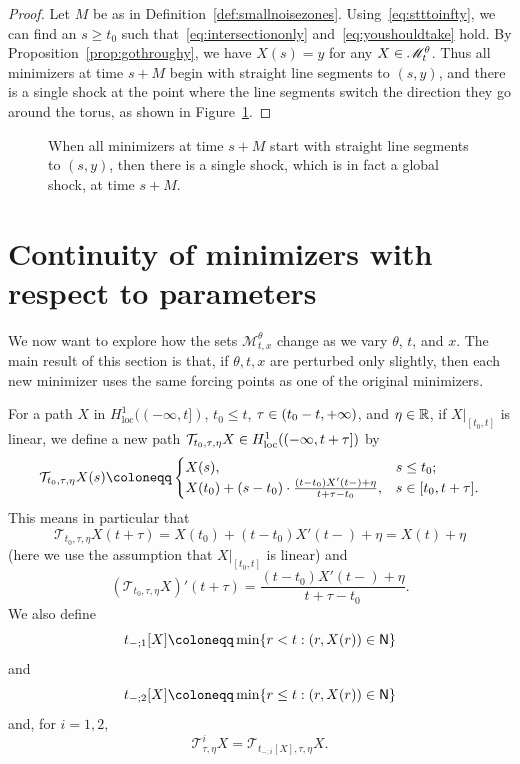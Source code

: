 \documentclass[AHL,Unicode,longabstracts]{cedram}
\newcounter{setofcase}
\newcounter{case}[setofcase]
\newcommand*\ssN{\mathsf{N}}
\newcommand*\scM{\mathscr{M}}
\newcommand*\RR{\mathbb{R}}
\newcommand{\clT}{\mathcal{T}}
\newcommand*\st{\mathrel{:}}
\DeclareMathOperator{\locc}{loc}
\let\oldin\in
\renewcommand{\in}{\mathchoice{\oldin}{\oldin}{\,\oldin\,}{\,\oldin\,}}
\newcommand*\RR{\mathbb{R}}
\begin{document}
\begin{proof}
Let $M$ be as in Definition~\ref{def:smallnoisezones}. Using~\eqref{eq:stttoinfty}, we can find an $s\ge t_{0}$ such that~\eqref{eq:intersectiononly} and~\eqref{eq:youshouldtake} hold. By Proposition~\ref{prop:gothroughy}, we have $X(s)=y$ for any $X\in\scM_{t}^{\theta}$. Thus all minimizers at time $s+M$ begin with straight line segments to $(s,y)$, and there is a single shock at the point where the line segments switch the direction they go around the torus, as shown in
Figure~\ref{fig:single_shock_picture}.\qedhere
\end{proof}

\begin{figure}[!htbp]
\begin{centering}

\end{centering}
\caption[Sufficient criterion to have a single global shock at a given time]{When all minimizers at time $s+M$ start with straight line segments to $(s,y)$, then there is a single shock, which is in fact a global shock, at time $s+M$.
}
\label{fig:single_shock_picture}
\end{figure}



\section{Continuity of minimizers with respect to parameters}
\label{sec:Continuity-of-minimizers}
We now want to explore how the sets $\scM_{t,x}^{\theta}$ change as we vary $\theta$, $t$, and $x$. The main result of this section is that, if $\theta,t,x$ are perturbed only slightly, then each new minimizer uses the same forcing points as one of the original minimizers.

For a path $X$ in $H_{\locc}^{1}((-\infty,t])$, $t_{0}\le t$, $\tau\in(t_{0}-t,+\infty)$, and $\eta\in\RR$, if $X|_{[t_{0},t]}$ is linear, we define a new path $\clT_{t_{0},\tau,\eta}X\in H_{\locc}^{1}((-\infty,t+\tau])$ by
\[
\clT_{t_{0},\tau,\eta}X(s)\coloneqq
\begin{cases}
X(s), & s\le t_{0};\\
X(t_{0})+(s-t_{0})\cdot\frac{(t-t_{0})X'(t-)+\eta}{t+\tau-t_{0}}, & s\in[t_{0},t+\tau].
\end{cases}
\]
This means in particular that
\[
\clT_{t_{0},\tau,\eta}X(t+\tau)=X(t_{0})+(t-t_{0})X'(t-)+\eta=X(t)+\eta
\]
(here we use the assumption that $X|_{[t_{0},t]}$ is linear) and
\begin{equation}\label{eq:TXderiv}
(\clT_{t_{0},\tau,\eta}X)'(t+\tau)=\frac{(t-t_{0})X'(t-)+\eta}{t+\tau-t_{0}}.
\end{equation}
We also define
\begin{equation}\label{eq:tminus1}
t_{-;1}[X]\coloneqq\min\{r<t\st(r,X(r))\in\ssN\}
\end{equation}
and
\begin{equation}\label{eq:tminus2}
t_{-;2}[X]\coloneqq\min\{r\le t\st(r,X(r))\in\ssN\}
\end{equation}
and, for $i=1,2$,
\begin{equation}\label{eq:Tidef}
\clT_{\tau,\eta}^{i}X=\clT_{t_{-;i}[X],\tau,\eta}X.
\end{equation}
\end{document}
